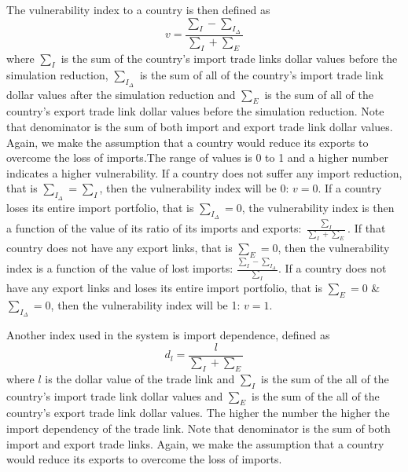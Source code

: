 	The vulnerability index to a country is then defined as 
	\begin{equation} \label{vulnerability}
		v=\frac{\sum _I - \sum _{I_\Delta}}{\sum _I + \sum _E}
	\end{equation}
	where $\sum _I$ is the sum of the country's import trade links dollar values before the simulation reduction, $\sum _{I_\Delta}$ is the sum of all of the country's import trade link dollar values after the simulation reduction and $\sum _E$ is the sum of all of the country's export trade link dollar values before the simulation reduction. Note that denominator is the sum of both import and export trade link dollar values. Again, we make the assumption that a country would reduce its exports to overcome the loss of imports.The range of values is 0 to 1 and a higher number indicates a higher vulnerability. If a country does not suffer any import reduction, that is $\sum _{I_\Delta}=\sum _I$, then the vulnerability index will be 0: $v=0$. If a country loses its entire import portfolio, that is $\sum _{I_\Delta}=0$, the vulnerability index is then a function of the value of its ratio of its imports and exports: $\frac{\sum _I}{\sum _I + \sum _E}$. If that country does not have any export links, that is $\sum _{E}=0$, then the vulnerability index is a function of the value of lost imports: $\frac{\sum _I - \sum _{I_\Delta}}{\sum _I}$. If a country does not have any export links and loses its entire import portfolio, that is $\sum _{E}=0$ \& $\sum _{I_\Delta}=0$, then the vulnerability index will be 1: $v=1$.\par
	Another index used in the system is import dependence, defined as 
	\begin{equation} \label{importRatio}
	d_l=\frac{l}{\sum _I + \sum _E}
	\end{equation}
	where $l$ is the dollar value of the trade link and $\sum _I$ is the sum of the all of the country's import trade link dollar values and $\sum _E$ is the sum of the all of the country's export trade link dollar values. The higher the number the higher the import dependency of the trade link. Note that denominator is the sum of both import and export trade links. Again, we make the assumption that a country would reduce its exports to overcome the loss of imports.
